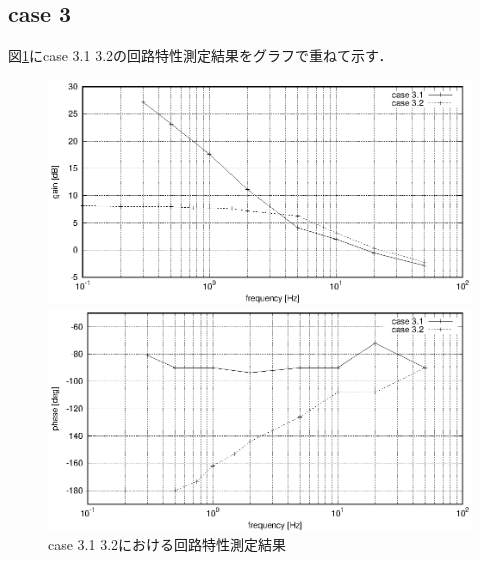 \documentclass[dvipdfmx,titlepage,a4j]{jsarticle}  %
\begin{document}
\subsection{case 3}
図\ref{fig:gr:case3}にcase 3.1 3.2の回路特性測定結果をグラフで重ねて示す．
\begin{figure}[H]
  \centering
  \begin{minipage}{8cm}
    \centering
    \includegraphics[keepaspectratio, scale=0.6]{../data/case3-g.eps}
  \end{minipage}
  \begin{minipage}{8cm}
    \centering
    \includegraphics[keepaspectratio, scale=0.6]{../data/case3-f.eps}
  \end{minipage}
  \caption{case 3.1 3.2における回路特性測定結果}
  \label{fig:gr:case3}
\end{figure}
\end{document}
